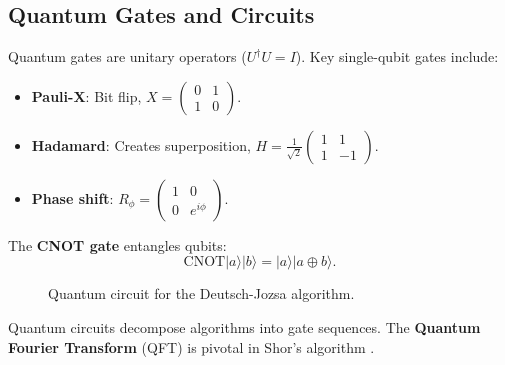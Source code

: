 \subsection{Quantum Gates and Circuits}
\label{subsec:gates}

Quantum gates are unitary operators ($U^\dagger U = I$). Key single-qubit gates include:
\begin{itemize}
    \item \textbf{Pauli-X}: Bit flip, $X = \begin{pmatrix} 0 & 1 \\ 1 & 0 \end{pmatrix}$.
    \item \textbf{Hadamard}: Creates superposition, $H = \frac{1}{\sqrt{2}}\begin{pmatrix} 1 & 1 \\ 1 & -1 \end{pmatrix}$.
    \item \textbf{Phase shift}: $R_\phi = \begin{pmatrix} 1 & 0 \\ 0 & e^{i\phi} \end{pmatrix}$.
\end{itemize}

The \textbf{CNOT gate} entangles qubits:
\[
\text{CNOT}|a\rangle|b\rangle = |a\rangle|a \oplus b\rangle.
\]

\begin{figure}[h]
\centering
{}
\caption{Quantum circuit for the Deutsch-Jozsa algorithm.}
\label{fig:deutsch_circuit}
\end{figure}

Quantum circuits decompose algorithms into gate sequences. The \textbf{Quantum Fourier Transform} (QFT) is pivotal in Shor's algorithm \cite{shor1999polynomial}.
